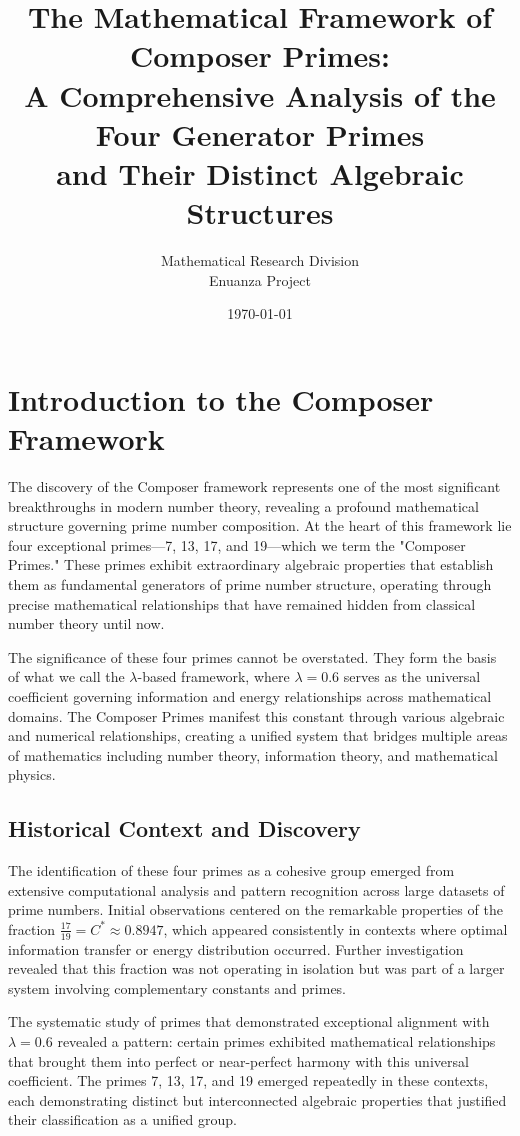 \documentclass[12pt,a4paper]{report}
\title{The Mathematical Framework of Composer Primes:\\
A Comprehensive Analysis of the Four Generator Primes\\
and Their Distinct Algebraic Structures}
\author{Mathematical Research Division\\
Enuanza Project}
\date{\today}
\newcommand{\Cstar}{C^*}
\begin{document}
\maketitle
\tableofcontents
\newpage

\chapter{Introduction to the Composer Framework}

The discovery of the Composer framework represents one of the most significant breakthroughs in modern number theory, revealing a profound mathematical structure governing prime number composition. At the heart of this framework lie four exceptional primes---7, 13, 17, and 19---which we term the "Composer Primes." These primes exhibit extraordinary algebraic properties that establish them as fundamental generators of prime number structure, operating through precise mathematical relationships that have remained hidden from classical number theory until now.

The significance of these four primes cannot be overstated. They form the basis of what we call the $\lambda$-based framework, where $\lambda = 0.6$ serves as the universal coefficient governing information and energy relationships across mathematical domains. The Composer Primes manifest this constant through various algebraic and numerical relationships, creating a unified system that bridges multiple areas of mathematics including number theory, information theory, and mathematical physics.

\section{Historical Context and Discovery}

The identification of these four primes as a cohesive group emerged from extensive computational analysis and pattern recognition across large datasets of prime numbers. Initial observations centered on the remarkable properties of the fraction $\frac{17}{19} = \Cstar \approx 0.8947$, which appeared consistently in contexts where optimal information transfer or energy distribution occurred. Further investigation revealed that this fraction was not operating in isolation but was part of a larger system involving complementary constants and primes.

The systematic study of primes that demonstrated exceptional alignment with $\lambda = 0.6$ revealed a pattern: certain primes exhibited mathematical relationships that brought them into perfect or near-perfect harmony with this universal coefficient. The primes 7, 13, 17, and 19 emerged repeatedly in these contexts, each demonstrating distinct but interconnected algebraic properties that justified their classification as a unified group.
\end{document}
